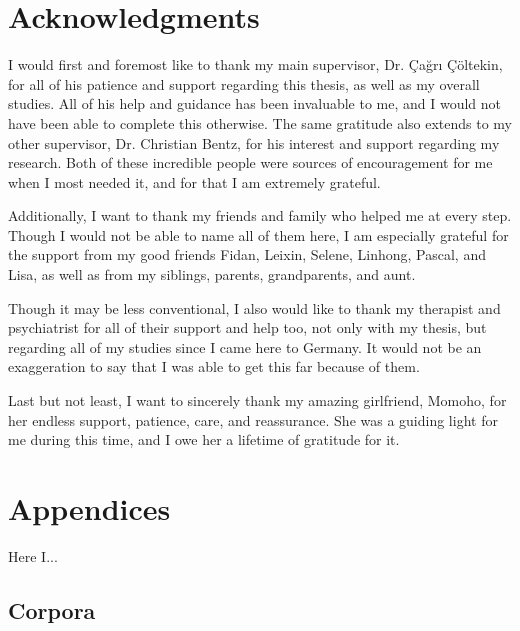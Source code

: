 \documentclass[12pt,a4paper]{article}
\numberwithin{figure}{section}
\numberwithin{table}{section}
\numberwithin{definition}{section}
\begin{document}
\newpage
\section{Acknowledgments}
\label{sec:acknowledgments}

I would first and foremost like to thank my main supervisor, Dr. Çağrı Çöltekin, for all of his patience and support regarding this thesis, as well as my overall studies. All of his help and guidance has been invaluable to me, and I would not have been able to complete this otherwise. The same gratitude also extends to my other supervisor, Dr. Christian Bentz, for his interest and support regarding my research. Both of these incredible people were sources of encouragement for me when I most needed it, and for that I am extremely grateful. 

Additionally, I want to thank my friends and family who helped me at every step. Though I would not be able to name all of them here, I am especially grateful for the support from my good friends Fidan, Leixin, Selene, Linhong, Pascal, and Lisa, as well as from my siblings, parents, grandparents, and aunt. 

Though it may be less conventional, I also would like to thank my therapist and psychiatrist for all of their support and help too, not only with my thesis, but regarding all of my studies since I came here to Germany. It would not be an exaggeration to say that I was able to get this far because of them.

Last but not least, I want to sincerely thank my amazing girlfriend, Momoho, for her endless support, patience, care, and reassurance. She was a guiding light for me during this time, and I owe her a lifetime of gratitude for it.

\newpage
\begingroup
\sloppy
\printbibliography
\endgroup

\newpage
\section{Appendices}
\label{sec:appendices}

Here I...

\subsection{Corpora}
\label{ssec:corporaapp}

\end{document}

